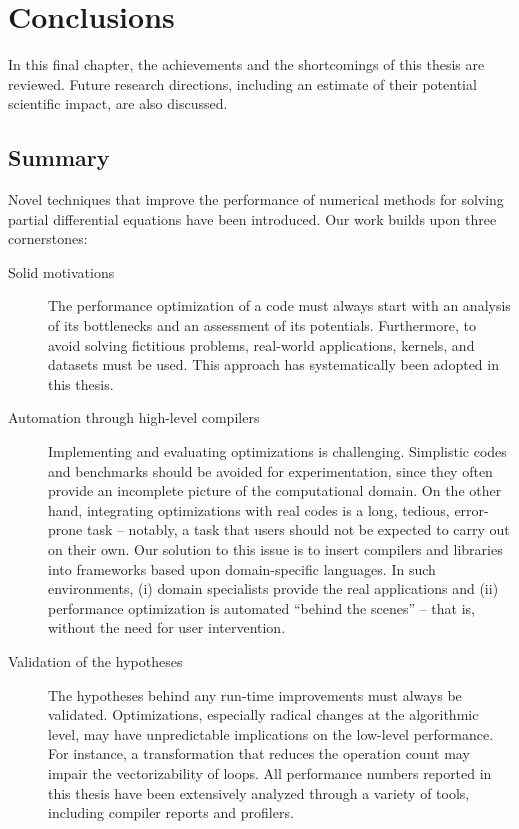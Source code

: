 \chapter{Conclusions}
In this final chapter, the achievements and the shortcomings of this thesis are reviewed. Future research directions, including an estimate of their potential scientific impact, are also discussed. 

\section{Summary}
Novel techniques that improve the performance of numerical methods for solving partial differential equations have been introduced. Our work builds upon three cornerstones:

\begin{description} 
\item[Solid motivations] The performance optimization of a code must always start with an analysis of its bottlenecks and an assessment of its potentials. Furthermore, to avoid solving fictitious problems, real-world applications, kernels, and datasets must be used. This approach has systematically been adopted in this thesis.
\item[Automation through high-level compilers] Implementing and evaluating optimizations is challenging. Simplistic codes and benchmarks should be avoided for experimentation, since they often provide an incomplete picture of the computational domain. On the other hand, integrating optimizations with real codes is a long, tedious, error-prone task -- notably, a task that users should not be expected to carry out on their own. Our solution to this issue is to insert compilers and libraries into frameworks based upon domain-specific languages. In such environments, (i) domain specialists provide the real applications and (ii) performance optimization is automated ``behind the scenes'' -- that is, without the need for user intervention.
\item[Validation of the hypotheses] The hypotheses behind any run-time improvements must always be validated. Optimizations, especially radical changes at the algorithmic level, may have unpredictable implications on the low-level performance. For instance, a transformation that reduces the operation count may impair the vectorizability of loops. All performance numbers reported in this thesis have been extensively analyzed through a variety of tools, including compiler reports and profilers. 
\end{description}

